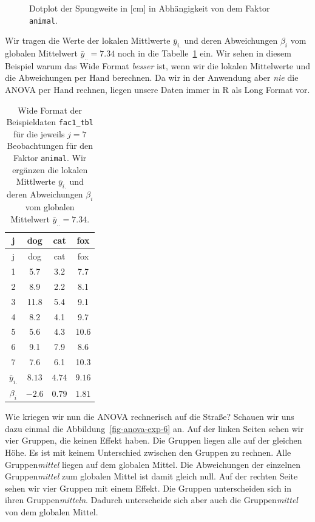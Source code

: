 \documentclass[
  letterpaper,
]{scrbook}
\begin{document}
\begin{figure}
\begin{minipage}[t]{0.33\linewidth}
{{}

}

\end{minipage}%

\caption{\label{fig-anova-exp-5}Dotplot der Spungweite in {[}cm{]} in
Abhängigkeit von dem Faktor \texttt{animal}.}

\end{figure}

Wir tragen die Werte der lokalen Mittlwerte \(\bar{y}_{i.}\) und deren
Abweichungen \(\beta_i\) vom globalen Mittelwert \(\bar{y}_{..} = 7.34\)
noch in die Tabelle~\ref{tbl-fac1-wide-02} ein. Wir sehen in diesem
Beispiel warum das Wide Format \emph{besser} ist, wenn wir die lokalen
Mittelwerte und die Abweichungen per Hand berechnen. Da wir in der
Anwendung aber \emph{nie} die ANOVA per Hand rechnen, liegen unsere
Daten immer in R als Long Format vor.

\hypertarget{tbl-fac1-wide-02}{}
\begin{longtable}[]{@{}cccc@{}}
\caption{\label{tbl-fac1-wide-02}Wide Format der Beispieldaten
\texttt{fac1\_tbl} für die jeweils \(j=7\) Beobachtungen für den Faktor
\texttt{animal}. Wir ergänzen die lokalen Mittlwerte \(\bar{y}_{i.}\)
und deren Abweichungen \(\beta_i\) vom globalen Mittelwert
\(\bar{y}_{..} = 7.34\).}\tabularnewline
\toprule()
j & dog & cat & fox \\
\midrule()
\endfirsthead
\toprule()
j & dog & cat & fox \\
\midrule()
\endhead
1 & 5.7 & 3.2 & 7.7 \\
2 & 8.9 & 2.2 & 8.1 \\
3 & 11.8 & 5.4 & 9.1 \\
4 & 8.2 & 4.1 & 9.7 \\
5 & 5.6 & 4.3 & 10.6 \\
6 & 9.1 & 7.9 & 8.6 \\
7 & 7.6 & 6.1 & 10.3 \\
\(\bar{y}_{i.}\) & \(8.13\) & \(4.74\) & \(9.16\) \\
\(\beta_i\) & \(-2.6\) & \(0.79\) & \(1.81\) \\
\bottomrule()
\end{longtable}

Wie kriegen wir nun die ANOVA rechnerisch auf die Straße? Schauen wir
uns dazu einmal die Abbildung~\ref{fig-anova-exp-6} an. Auf der linken
Seiten sehen wir vier Gruppen, die keinen Effekt haben. Die Gruppen
liegen alle auf der gleichen Höhe. Es ist mit keinem Unterschied
zwischen den Gruppen zu rechnen. Alle Gruppen\emph{mittel} liegen auf
dem globalen Mittel. Die Abweichungen der einzelnen Gruppen\emph{mittel}
zum globalen Mittel ist damit gleich null. Auf der rechten Seite sehen
wir vier Gruppen mit einem Effekt. Die Gruppen unterscheiden sich in
ihren Gruppen\emph{mitteln}. Dadurch unterscheide sich aber auch die
Gruppen\emph{mittel} von dem globalen Mittel.
\end{document}
